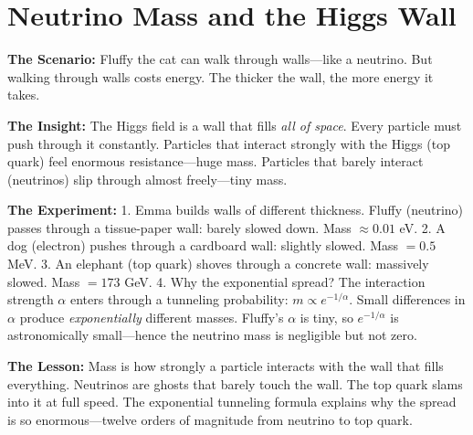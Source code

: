 \documentclass[11pt, a4paper, openany]{book}
\begin{document}
\section{Neutrino Mass and the Higgs Wall}
\begin{thoughtexp}
\textbf{The Scenario:} Fluffy the cat can walk through walls---like a neutrino. But walking through walls costs energy. The thicker the wall, the more energy it takes.

\textbf{The Insight:} The Higgs field is a wall that fills \emph{all of space}. Every particle must push through it constantly. Particles that interact strongly with the Higgs (top quark) feel enormous resistance---huge mass. Particles that barely interact (neutrinos) slip through almost freely---tiny mass.

\textbf{The Experiment:}
1. Emma builds walls of different thickness. Fluffy (neutrino) passes through a tissue-paper wall: barely slowed down. Mass $\approx 0.01$ eV.
2. A dog (electron) pushes through a cardboard wall: slightly slowed. Mass $= 0.5$ MeV.
3. An elephant (top quark) shoves through a concrete wall: massively slowed. Mass $= 173$ GeV.
4. Why the exponential spread? The interaction strength $\alpha$ enters through a tunneling probability: $m \propto e^{-1/\alpha}$. Small differences in $\alpha$ produce \emph{exponentially} different masses. Fluffy's $\alpha$ is tiny, so $e^{-1/\alpha}$ is astronomically small---hence the neutrino mass is negligible but not zero.

\textbf{The Lesson:} Mass is how strongly a particle interacts with the wall that fills everything. Neutrinos are ghosts that barely touch the wall. The top quark slams into it at full speed. The exponential tunneling formula explains why the spread is so enormous---twelve orders of magnitude from neutrino to top quark.
\end{thoughtexp}
\end{document}
